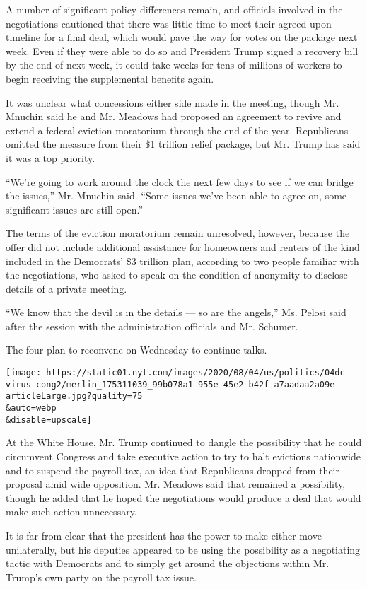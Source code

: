 A number of significant policy differences remain, and officials
involved in the negotiations cautioned that there was little time to
meet their agreed-upon timeline for a final deal, which would pave the
way for votes on the package next week. Even if they were able to do so
and President Trump signed a recovery bill by the end of next week, it
could take weeks for tens of millions of workers to begin receiving the
supplemental benefits again.

It was unclear what concessions either side made in the meeting, though
Mr. Mnuchin said he and Mr. Meadows had proposed an agreement to revive
and extend a federal eviction moratorium through the end of the year.
Republicans omitted the measure from their \$1 trillion relief package,
but Mr. Trump has said it was a top priority.

``We're going to work around the clock the next few days to see if we
can bridge the issues,'' Mr. Mnuchin said. ``Some issues we've been able
to agree on, some significant issues are still open.''

The terms of the eviction moratorium remain unresolved, however, because
the offer did not include additional assistance for homeowners and
renters of the kind included in the Democrats' \$3 trillion plan,
according to two people familiar with the negotiations, who asked to
speak on the condition of anonymity to disclose details of a private
meeting.

``We know that the devil is in the details --- so are the angels,'' Ms.
Pelosi said after the session with the administration officials and Mr.
Schumer.

The four plan to reconvene on Wednesday to continue talks.

\texttt{[image: https://static01.nyt.com/images/2020/08/04/us/politics/04dc-virus-cong2/merlin\_175311039\_99b078a1-955e-45e2-b42f-a7aadaa2a09e-articleLarge.jpg?quality=75\\\&auto=webp\\\&disable=upscale]}

At the White House, Mr. Trump continued to dangle the possibility that
he could circumvent Congress and take executive action to try to halt
evictions nationwide and to suspend the payroll tax, an idea that
Republicans dropped from their proposal amid wide opposition. Mr.
Meadows said that remained a possibility, though he added that he hoped
the negotiations would produce a deal that would make such action
unnecessary.

It is far from clear that the president has the power to make either
move unilaterally, but his deputies appeared to be using the possibility
as a negotiating tactic with Democrats and to simply get around the
objections within Mr. Trump's own party on the payroll tax issue.

